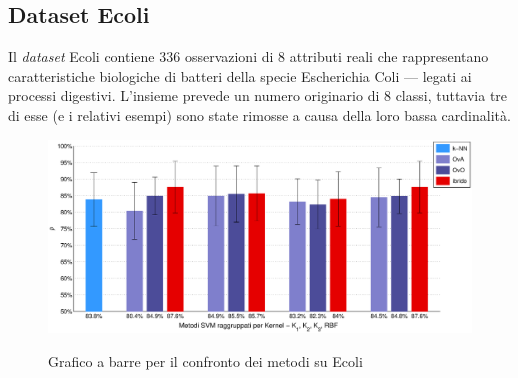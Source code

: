 \subsection{Dataset Ecoli} %
Il \textit{dataset} Ecoli contiene 336 osservazioni di 8 attributi reali che rappresentano caratteristiche biologiche di batteri della specie Escherichia Coli --- legati ai processi digestivi. L'insieme prevede un numero originario di 8 classi, tuttavia tre di esse (e i relativi esempi) sono state rimosse a causa della loro bassa cardinalità.

\begin{figure}[H] %
 	\centering	
	
	\fboxsep=0mm%
	\fboxrule=1mm%

	 {
		\includegraphics[width=\textwidth]{img/BarEcoli.eps}
	}	
	\caption{Grafico a barre per il confronto dei metodi su Ecoli}
\end{figure}

